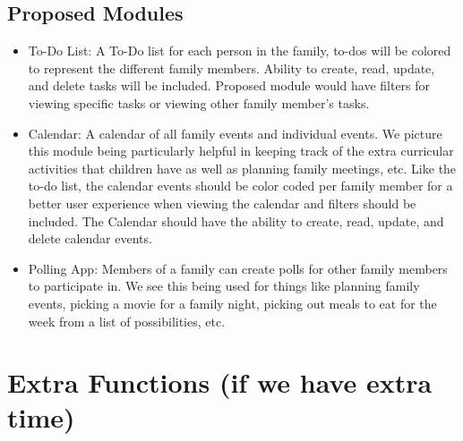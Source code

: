 \documentclass[12pt]{article}
\begin{document}
\subsection{Proposed Modules}
\begin{itemize}
    \item To-Do List: A To-Do list for each person in the family, to-dos will be colored to represent
            the different family members. Ability to create, read, update, and delete tasks will be included.
            Proposed module would have filters for viewing specific tasks or viewing other family member's tasks.
    \item Calendar: A calendar of all family events and individual events. We picture this module being particularly
            helpful in keeping track of the extra curricular activities that children have as well as planning
            family meetings, etc. Like the to-do list, the calendar events should be color coded per family member
            for a better user experience when viewing the calendar and filters should be included. The Calendar should have 
            the ability to create, read, update, and delete calendar events.
    \item Polling App: Members of a family can create polls for other family members to participate in. We see this being
            used for things like planning family events, picking a movie for a family night, picking out meals to eat for
            the week from a list of possibilities, etc. 
\end{itemize}

\begingroup
\section{Extra Functions (if we have extra time)}
\end{document}
